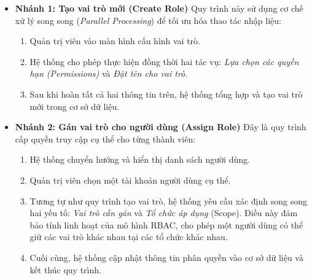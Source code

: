 \begin{itemize}
    \item \textbf{Nhánh 1: Tạo vai trò mới (Create Role)}
    Quy trình này sử dụng cơ chế xử lý song song (\textit{Parallel Processing}) để tối ưu hóa thao tác nhập liệu:
    \begin{enumerate}
        \item Quản trị viên vào màn hình cấu hình vai trò.
        \item Hệ thống cho phép thực hiện đồng thời hai tác vụ: \textit{Lựa chọn các quyền hạn (Permissions)} và \textit{Đặt tên cho vai trò}.
        \item Sau khi hoàn tất cả hai thông tin trên, hệ thống tổng hợp và tạo vai trò mới trong cơ sở dữ liệu.
    \end{enumerate}

    \item \textbf{Nhánh 2: Gán vai trò cho người dùng (Assign Role)}
    Đây là quy trình cấp quyền truy cập cụ thể cho từng thành viên:
    \begin{enumerate}
        \item Hệ thống chuyển hướng và hiển thị danh sách người dùng.
        \item Quản trị viên chọn một tài khoản người dùng cụ thể.
        \item Tương tự như quy trình tạo vai trò, hệ thống yêu cầu xác định song song hai yếu tố: \textit{Vai trò cần gán} và \textit{Tổ chức áp dụng} (Scope). Điều này đảm bảo tính linh hoạt của mô hình RBAC, cho phép một người dùng có thể giữ các vai trò khác nhau tại các tổ chức khác nhau.
        \item Cuối cùng, hệ thống cập nhật thông tin phân quyền vào cơ sở dữ liệu và kết thúc quy trình.
    \end{enumerate}
\end{itemize}